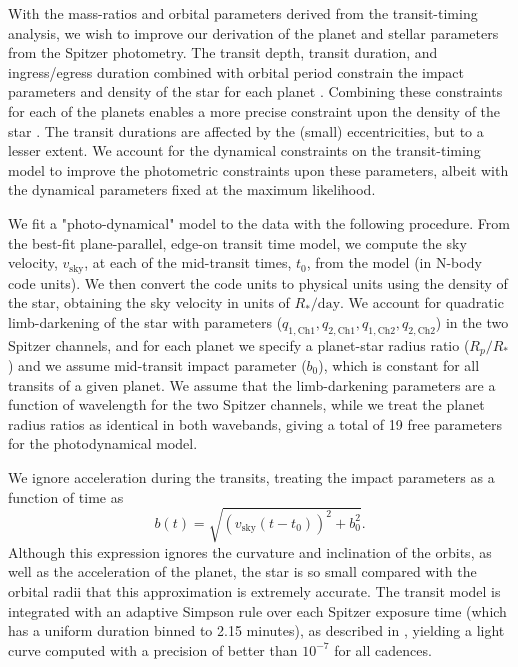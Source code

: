 \documentclass[twocolumn]{aastex63}
\begin{document}
With the mass-ratios and orbital parameters derived from the transit-timing
analysis, we wish to improve our derivation of the planet and stellar parameters 
from the Spitzer photometry.   The transit depth, transit duration, and ingress/egress 
duration combined with  orbital period constrain the impact parameters and density 
of the star for each planet \citep{Seager2003}.  Combining these constraints for 
each of the planets  enables a more precise constraint upon the density of the 
star \citep{Kipping2012a}.
The transit durations are affected by the (small) eccentricities, but to a lesser extent.  We account 
for the dynamical constraints on the transit-timing model to improve the
photometric constraints upon these parameters, albeit with the dynamical parameters fixed 
at the maximum likelihood.

We fit a "photo-dynamical" model \citep{Carter2012} to the data with the following procedure.
From the best-fit plane-parallel, edge-on transit time model,
we compute the sky velocity, $v_\mathrm{sky}$, at each of the mid-transit times, $t_0$,
from the model (in N-body code units).  We then convert the code units to physical 
units using the density of the star, obtaining the sky velocity in units
of $R_*/\mathrm{day}$.
We account for quadratic limb-darkening of the star with parameters ($q_\mathrm{1,Ch1}, q_\mathrm{2,Ch1},q_\mathrm{1,Ch2},q_\mathrm{2,Ch2}$) in the two Spitzer channels, and for each
planet we specify a planet-star radius ratio ($R_p/R_*$) and we assume
mid-transit impact parameter ($b_0$), which is constant for all transits of
a given planet.  We assume that the limb-darkening parameters are a function
of wavelength for the two Spitzer channels, while we treat the planet radius
ratios as identical in both wavebands, giving a total of 19 free parameters
for the photodynamical model.

We ignore acceleration during the transits, treating the impact parameters as 
a function of time as
\begin{equation}
    b(t) = \sqrt{(v_\mathrm{sky} (t-t_0))^2 + b_0^2}.
\end{equation}
Although this expression ignores the curvature and inclination of the orbits, as well
as the acceleration of the planet, the star is so small compared with the orbital 
radii that this approximation is extremely accurate.  The transit model is integrated 
with an adaptive Simpson rule over each Spitzer exposure time (which has a uniform
duration binned to 2.15 minutes), as described in \citet{Agol2019}, yielding
a light curve computed with a precision of better than $10^{-7}$ for all cadences.
\end{document}
